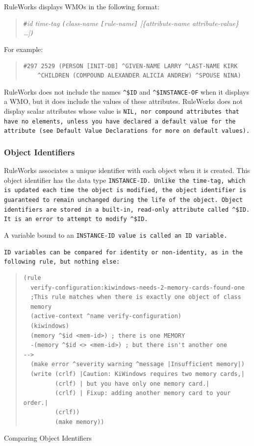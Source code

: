 RuleWorks displays WMOs in the following format:

\begin{quote}
  \verb|#|\it{id} \it{time-tag} \verb|(|\it{class-name}
  \verb|[|\it{rule-name}\verb|]| [\{\ct\it{attribute-name}
  \it{attribute-value}\} \ldots]\verb|)|
\end{quote}

For example:

\begin{quote}
\begin{verbatim}
#297 2529 (PERSON [INIT-DB] ^GIVEN-NAME LARRY ^LAST-NAME KIRK
    ^CHILDREN (COMPOUND ALEXANDER ALICIA ANDREW) ^SPOUSE NINA)
\end{verbatim}
\end{quote}

RuleWorks does not include the names \verb|^$ID| and \verb|^$INSTANCE-OF|
when it displays a WMO, but it does include the values of
these attributes. RuleWorks does not display scalar
attributes whose value is \tt{NIL}, nor compound attributes that
have no elements, unless you have declared a default value
for the attribute (see Default Value Declarations for more on
default values).

\subsubsection*{Object Identifiers}

RuleWorks associates a unique identifier with each object
when it is created. This object identifier has the data type
\tt{INSTANCE-ID}. Unlike the time-tag, which is updated each time
the object is modified, the object identifier is guaranteed
to remain unchanged during the life of the object. Object
identifiers are stored in a built-in, read-only attribute
called \verb|^$ID|. It is an error to attempt to modify \verb|^$ID|.

A variable bound to an \tt{INSTANCE-ID} value is called an \tt{ID}
variable.

\tt{ID} variables can be compared for identity or non-identity,
as in the following rule, but nothing else:

\begin{example}[h]
\begin{quote}
\begin{verbatim}
(rule
  verify-configuration:kiwindows-needs-2-memory-cards-found-one
  ;This rule matches when there is exactly one object of class
  memory
  (active-context ^name verify-configuration)
  (kiwindows)
  (memory ^$id <mem-id>) ; there is one MEMORY
  -(memory ^$id <> <mem-id>) ; but there isn't another one
-->
  (make error ^severity warning ^message |Insufficient memory|)
  (write (crlf) |Caution: KiWindows requires two memory cards,|
         (crlf) | but you have only one memory card.|
         (crlf) | Fixup: adding another memory card to your order.|
         (crlf))
         (make memory))
\end{verbatim}
\end{quote}
\caption{Comparing Object Identifiers}
\end{example}

